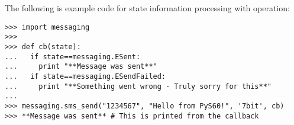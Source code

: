 The following is example code for state information processing with 
 operation:

\begin{verbatim}
>>> import messaging
>>>
>>> def cb(state):
...   if state==messaging.ESent:
...     print "**Message was sent**"
...   if state==messaging.ESendFailed:
...     print "**Something went wrong - Truly sorry for this**"
...
>>> messaging.sms_send("1234567", "Hello from PyS60!", '7bit', cb)
>>> **Message was sent** # This is printed from the callback
\end{verbatim}
